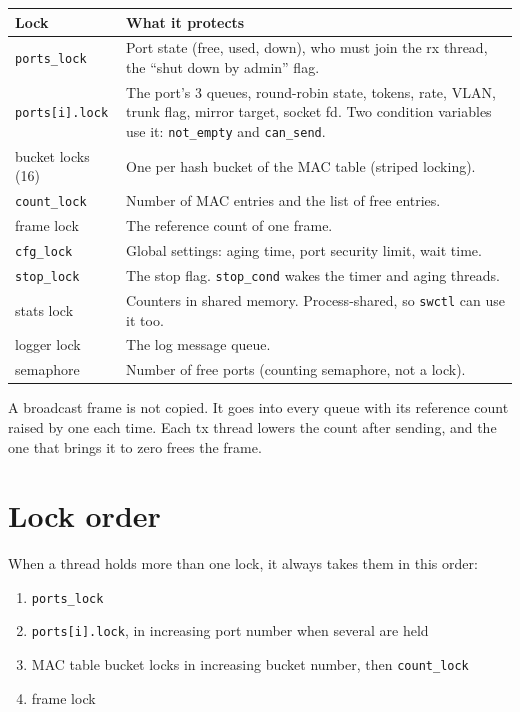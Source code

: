 \documentclass[11pt,a4paper]{article}
\begin{document}
\begin{tabular}{@{}lp{11.2cm}@{}}
\toprule
Lock & What it protects \\
\midrule
\texttt{ports\_lock} & Port state (free, used, down), who must join the rx thread, the ``shut down by admin'' flag. \\
\texttt{ports[i].lock} & The port's 3 queues, round-robin state, tokens, rate, VLAN, trunk flag, mirror target, socket fd.
                         Two condition variables use it: \texttt{not\_empty} and \texttt{can\_send}. \\
bucket locks (16) & One per hash bucket of the MAC table (striped locking). \\
\texttt{count\_lock} & Number of MAC entries and the list of free entries. \\
frame lock & The reference count of one frame. \\
\texttt{cfg\_lock} & Global settings: aging time, port security limit, wait time. \\
\texttt{stop\_lock} & The stop flag. \texttt{stop\_cond} wakes the timer and aging threads. \\
stats lock & Counters in shared memory. Process-shared, so \texttt{swctl} can use it too. \\
logger lock & The log message queue. \\
semaphore & Number of free ports (counting semaphore, not a lock). \\
\bottomrule
\end{tabular}

A broadcast frame is not copied. It goes into every queue with its reference
count raised by one each time. Each tx thread lowers the count after sending, and
the one that brings it to zero frees the frame.

\section{Lock order}

When a thread holds more than one lock, it always takes them in this order:

\begin{enumerate}
\setlength{\itemsep}{0pt}
\item \texttt{ports\_lock}
\item \texttt{ports[i].lock}, in increasing port number when several are held
\item MAC table bucket locks in increasing bucket number, then \texttt{count\_lock}
\item frame lock
\end{enumerate}
\end{document}
